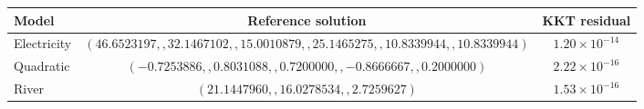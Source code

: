 \begin{tabular}{lcc}
\toprule
Model & Reference solution & KKT residual \\
\midrule
Electricity & $(46.6523197,,32.1467102,,15.0010879,,25.1465275,,10.8339944,,10.8339944)$ & $1.20\times10^{-14}$ \\
Quadratic & $(-0.7253886,,0.8031088,,0.7200000,,-0.8666667,,0.2000000)$ & $2.22\times10^{-16}$ \\
River & $(21.1447960,,16.0278534,,2.7259627)$ & $1.53\times10^{-16}$ \\
\bottomrule
\end{tabular}
